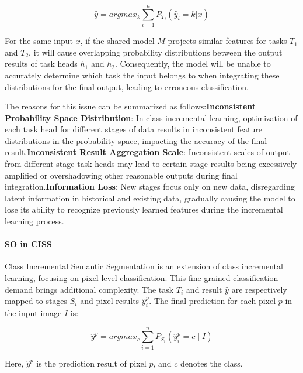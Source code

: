 \[\hat{y}=argmax_k\sum_{i=1}^nP_{T_i}(\hat{y}_i=k|x)\]

For the same input \(x\), if the shared model \(M\) projects similar features for tasks \({T_1}\) and \({T_2}\), it will cause overlapping probability distributions between the output results of task heads \({h_1}\) and \({h_2}\). Consequently, the model will be unable to accurately determine which task the input belongs to when integrating these distributions for the final output, leading to erroneous classification.

The reasons for this issue can be summarized as follows:\textbf{Inconsistent Probability Space Distribution}: In class incremental learning, optimization of each task head for different stages of data results in inconsistent feature distributions in the probability space, impacting the accuracy of the final result.\textbf{Inconsistent Result Aggregation Scale}: Inconsistent scales of output from different stage task heads may lead to certain stage results being excessively amplified or overshadowing other reasonable outputs during final integration.\textbf{Information Loss}: New stages focus only on new data, disregarding latent information in historical and existing data, gradually causing the model to lose its ability to recognize previously learned features during the incremental learning process.




\paragraph{SO in CISS}
Class Incremental Semantic Segmentation is an extension of class incremental learning, focusing on pixel-level classification. This fine-grained classification demand brings additional complexity. The task \({T_i}\) and result \(\hat{y}\) are respectively mapped to stages  \({S_i}\) and pixel results \(\hat{y}_i^p\). The final prediction for each pixel \(p\) in the input image \(I\) is:

\[\hat{y}^p=argmax_c\sum_{i=1}^nP_{S_i}(\hat{y}_i^p=c\mid I)\]

Here, \(\hat{y}^p\) is the prediction result of pixel \(p\), and \(c\) denotes the class.

